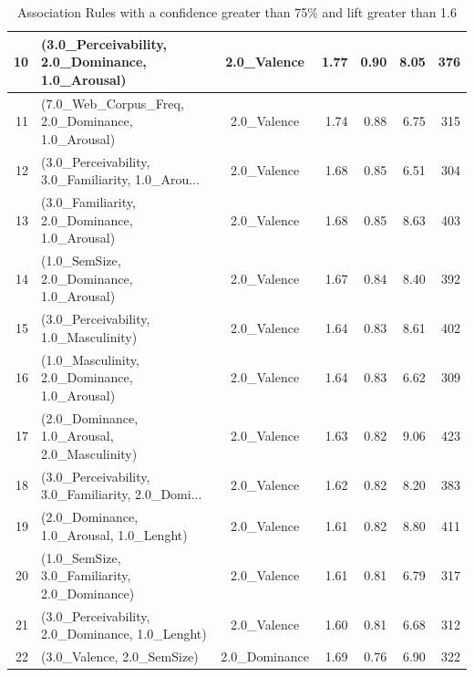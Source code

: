 \documentclass[a4paper,11pt,dvipsnames]{article}
\begin{document}
\begin{table}[h]
{\begin{tabular}{|r|l|c|r|r|r|r|}
10 &   (3.0\_Perceivability, 2.0\_Dominance, 1.0\_Arousal) &         2.0\_Valence &  1.77 &  0.90 &      8.05 &   376 \\\hline
11 &  (7.0\_Web\_Corpus\_Freq, 2.0\_Dominance, 1.0\_Arousal) &         2.0\_Valence &  1.74 &  0.88 &      6.75 &   315 \\\hline
12 &  (3.0\_Perceivability, 3.0\_Familiarity, 1.0\_Arou... &         2.0\_Valence &  1.68 &  0.85 &      6.51 &   304 \\\hline
13 &      (3.0\_Familiarity, 2.0\_Dominance, 1.0\_Arousal) &         2.0\_Valence &  1.68 &  0.85 &      8.63 &   403 \\\hline
14 &          (1.0\_SemSize, 2.0\_Dominance, 1.0\_Arousal) &         2.0\_Valence &  1.67 &  0.84 &      8.40 &   392 \\\hline
15 &              (3.0\_Perceivability, 1.0\_Masculinity) &         2.0\_Valence &  1.64 &  0.83 &      8.61 &   402 \\\hline
16 &      (1.0\_Masculinity, 2.0\_Dominance, 1.0\_Arousal) &         2.0\_Valence &  1.64 &  0.83 &      6.62 &   309 \\\hline
17 &      (2.0\_Dominance, 1.0\_Arousal, 2.0\_Masculinity) &         2.0\_Valence &  1.63 &  0.82 &      9.06 &   423 \\\hline
18 &  (3.0\_Perceivability, 3.0\_Familiarity, 2.0\_Domi... &         2.0\_Valence &  1.62 &  0.82 &      8.20 &   383 \\\hline
19 &           (2.0\_Dominance, 1.0\_Arousal, 1.0\_Lenght) &         2.0\_Valence &  1.61 &  0.82 &      8.80 &   411 \\\hline
20 &      (1.0\_SemSize, 3.0\_Familiarity, 2.0\_Dominance) &         2.0\_Valence &  1.61 &  0.81 &      6.79 &   317 \\\hline
21 &    (3.0\_Perceivability, 2.0\_Dominance, 1.0\_Lenght) &         2.0\_Valence &  1.60 &  0.81 &      6.68 &   312 \\\hline
22 &                         (3.0\_Valence, 2.0\_SemSize) &       2.0\_Dominance &  1.69 &  0.76 &      6.90 &   322 \\
\bottomrule
\end{tabular}
}
        \caption{Association Rules with a confidence greater than 75\% and lift greater than 1.6}\label{tab:rules}

\end{table}
\end{document}
